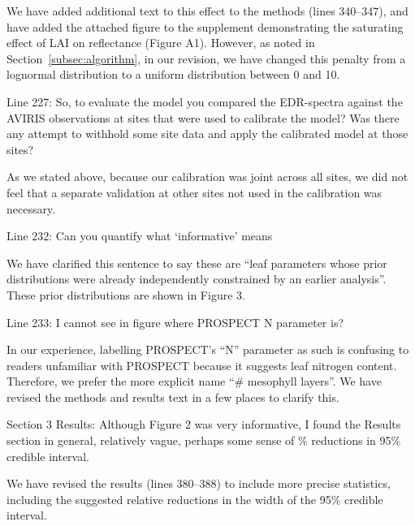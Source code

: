 We have added additional text to this effect to the methods (lines 340--347), and have added the attached figure to the supplement demonstrating the saturating effect of LAI on reflectance (Figure A1).
However, as noted in Section~\ref{subsec:algorithm}, in our revision, we have changed this penalty from a lognormal distribution to a uniform distribution between 0 and 10.

\begin{reviewer}
  Line 227: So, to evaluate the model you compared the EDR-spectra against the AVIRIS observations at sites that were used to calibrate the model? Was there any attempt to withhold some site data and apply the calibrated model at those sites?
\end{reviewer}

As we stated above, because our calibration was joint across all sites, we did not feel that a separate validation at other sites not used in the calibration was necessary.

\begin{reviewer}
  Line 232: Can you quantify what ‘informative’ means
\end{reviewer}

We have clarified this sentence to say these are ``leaf parameters whose prior distributions were already independently constrained by an earlier analysis''. These prior distributions are shown in Figure 3.

\begin{reviewer}
  Line 233: I cannot see in figure where PROSPECT N parameter is?
\end{reviewer}

In our experience, labelling PROSPECT’s ``N'' parameter as such is confusing to readers unfamiliar with PROSPECT because it suggests leaf nitrogen content.
Therefore, we prefer the more explicit name ``\# mesophyll layers''.
We have revised the methods and results text in a few places to clarify this.

\begin{reviewer}
  Section 3 Results: Although Figure 2 was very informative, I found the Results section in general, relatively vague, perhaps some sense of \% reductions in 95\% credible interval.
\end{reviewer}

We have revised the results (lines 380--388) to include more precise statistics, including the suggested relative reductions in the width of the 95\% credible interval.

